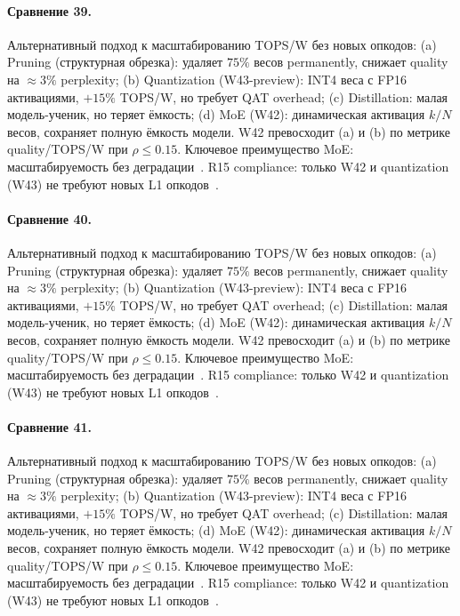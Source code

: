 \paragraph{Сравнение 39.} Альтернативный подход к масштабированию TOPS/W без новых опкодов: (a) Pruning (структурная обрезка): удаляет $75\%$ весов permanently, снижает quality на $\approx 3\%$ perplexity; (b) Quantization (W43-preview): INT4 веса с FP16 активациями, $+15\%$ TOPS/W, но требует QAT overhead; (c) Distillation: малая модель-ученик, но теряет ёмкость; (d) MoE (W42): динамическая активация $k/N$ весов, сохраняет полную ёмкость модели. W42 превосходит (a) и (b) по метрике quality/TOPS/W при $\rho \leq 0{.}15$. Ключевое преимущество MoE: масштабируемость без деградации~\cite{switch_transformer2021,mixtral2024}. R15 compliance: только W42 и quantization (W43) не требуют новых L1 опкодов~\cite{lee_gvsu_proof2021}.

\paragraph{Сравнение 40.} Альтернативный подход к масштабированию TOPS/W без новых опкодов: (a) Pruning (структурная обрезка): удаляет $75\%$ весов permanently, снижает quality на $\approx 3\%$ perplexity; (b) Quantization (W43-preview): INT4 веса с FP16 активациями, $+15\%$ TOPS/W, но требует QAT overhead; (c) Distillation: малая модель-ученик, но теряет ёмкость; (d) MoE (W42): динамическая активация $k/N$ весов, сохраняет полную ёмкость модели. W42 превосходит (a) и (b) по метрике quality/TOPS/W при $\rho \leq 0{.}15$. Ключевое преимущество MoE: масштабируемость без деградации~\cite{switch_transformer2021,mixtral2024}. R15 compliance: только W42 и quantization (W43) не требуют новых L1 опкодов~\cite{lee_gvsu_proof2021}.

\paragraph{Сравнение 41.} Альтернативный подход к масштабированию TOPS/W без новых опкодов: (a) Pruning (структурная обрезка): удаляет $75\%$ весов permanently, снижает quality на $\approx 3\%$ perplexity; (b) Quantization (W43-preview): INT4 веса с FP16 активациями, $+15\%$ TOPS/W, но требует QAT overhead; (c) Distillation: малая модель-ученик, но теряет ёмкость; (d) MoE (W42): динамическая активация $k/N$ весов, сохраняет полную ёмкость модели. W42 превосходит (a) и (b) по метрике quality/TOPS/W при $\rho \leq 0{.}15$. Ключевое преимущество MoE: масштабируемость без деградации~\cite{switch_transformer2021,mixtral2024}. R15 compliance: только W42 и quantization (W43) не требуют новых L1 опкодов~\cite{lee_gvsu_proof2021}.

